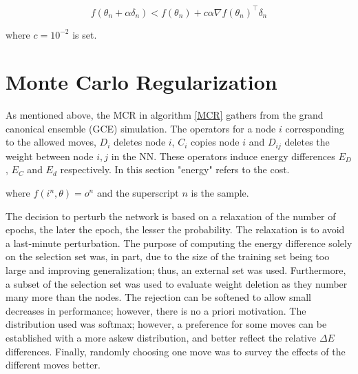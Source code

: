 \[f(\theta_n + \alpha \delta_n) < f(\theta_n) + c \alpha \nabla f(\theta_n)^\intercal \delta_n\]

where $c = 10^{-2}$ is set.

\section{Monte Carlo Regularization}

As mentioned above, the MCR in algorithm \ref{MCR} gathers from the grand canonical ensemble (GCE) simulation. The operators for a node $i$ corresponding to the allowed moves, $D_i$ deletes node $i$, $C_i$ copies node $i$ and $D_{ij}$ deletes the weight between node $i,j$ in the NN. These operators induce energy differences $E_D$, $E_C$ and $E_d$ respectively. In this section "energy" refers to the cost.


\noindent
where $f(i^n, \theta)= o^n$ and the superscript $n$ is the sample.

The decision to perturb the network is based on a relaxation of the number of epochs, the later the epoch, the lesser the probability. The relaxation is to avoid a last-minute perturbation. The purpose of computing the energy difference solely on the selection set was, in part, due to the size of the training set being too large and improving generalization; thus, an external set was used. Furthermore, a subset of the selection set was used to evaluate weight deletion as they number many more than the nodes. The rejection can be softened to allow small decreases in performance; however, there is no a priori motivation. The distribution used was softmax; however, a preference for some moves can be established with a more askew distribution, and better reflect the relative $\Delta E$ differences. Finally, randomly choosing one move was to survey the effects of the different moves better.  

